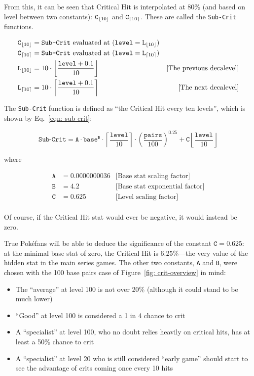\noindent From this, it can be seen that Critical Hit is interpolated at 80\% (and based on level between two constants): $\texttt{C}_{\lfloor10\rfloor}$ and $\texttt{C}_{\lceil10\rceil}$. These are called the \texttt{Sub-Crit} functions.

\begin{align*}
	\texttt{C}_{\lfloor10\rfloor} &= \texttt{Sub-Crit} \text{ evaluated at } (\texttt{level} = \texttt{L}_{\lfloor10\rfloor})\\
	\texttt{C}_{\lceil10\rceil} &= \texttt{Sub-Crit} \text{ evaluated at } (\texttt{level} = \texttt{L}_{\lceil10\rceil})\\
	\texttt{L}_{\lfloor10\rfloor} &= 10\cdot \left\lfloor \frac{\texttt{level}+0.1}{10} \right\rfloor & \text{[The previous decalevel]} \\ 
	\texttt{L}_{\lceil10\rceil} &= 10\cdot \left\lceil \frac{\texttt{level}+0.1}{10} \right\rceil & \text{[The next decalevel]}
\end{align*}

\noindent The \texttt{Sub-Crit} function is defined as ``the Critical Hit every ten levels'', which is shown by Eq.~\eqref{eqn: sub-crit}:

\begin{equation}\label{eqn: sub-crit}
	\texttt{Sub-Crit} = 	\texttt{A} \cdot \texttt{base}^\texttt{B} 
						\cdot \left\lceil \frac{\texttt{level}}{10} \right\rceil
						\cdot \left(\frac{\texttt{pairs}}{100}\right)^{0.25}
						+ \texttt{C} \left\lfloor \frac{\texttt{level}}{10} \right\rfloor						
\end{equation}

\noindent where

\begin{align*}
	\texttt{A} &= 0.0000000036 	& \text{[Base stat scaling factor]}\\
	\texttt{B} &= 4.2			& \text{[Base stat exponential factor]}\\
	\texttt{C} &= 0.625			& \text{[Level scaling factor]}\\
\end{align*}

\noindent Of course, if the Critical Hit stat would ever be negative, it would instead be zero.

True Pok\'{e}fans will be able to deduce the significance of the constant $\texttt{C} = 0.625$: at the minimal base stat of zero, the Critical Hit is 6.25\%---the very value of the hidden stat in the main series games. The other two constants, \texttt{A} and \texttt{B}, were chosen with the 100 base pairs case of Figure~\ref{fig: crit-overview} in mind:
\begin{itemize}
	\item{The ``average'' at level 100 is not over 20\% (although it could stand to be much lower)}
	\item{``Good'' at level 100 is considered a 1 in 4 chance to crit}
	\item{A ``specialist'' at level 100, who no doubt relies heavily on critical hits, has at least a 50\% chance to crit}
	\item{A ``specialist'' at level 20 who is still considered ``early game'' should start to see the advantage of crits coming once every 10 hits}
\end{itemize}


